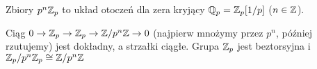 \begin{wniosek}
	Zbiory  $p^n\mathbb Z_p$ to układ otoczeń dla zera kryjący $\mathbb Q_p = \mathbb Z_p[1/p]$ ($n \in \mathbb Z$).
\end{wniosek}

\begin{wniosek}
	Ciąg  $0 \to \mathbb Z_p \to \mathbb Z_p \to \mathbb Z/p^n\mathbb Z \to 0$ (najpierw mnożymy przez $p^n$, później rzutujemy) jest dokładny, a strzałki ciągłe.
	Grupa $\mathbb Z_p$ jest beztorsyjna i ${\mathbb Z_p}/{p^n \mathbb Z_p} \cong {\mathbb Z}/{p^n \mathbb Z}$
\end{wniosek}